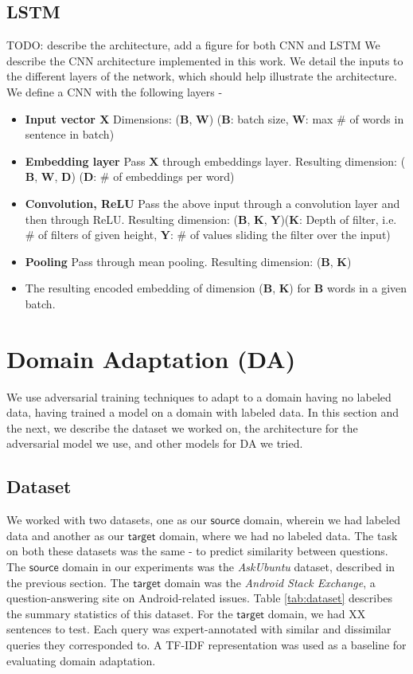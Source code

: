 \documentclass{sigkddExp}
\begin{document}
\subsection{LSTM}
{\color{red} TODO: describe the architecture, add a figure for both CNN and LSTM}
We describe the CNN architecture implemented in this work. We detail the inputs to the different layers of the network, which should help illustrate the architecture.
We define a CNN with the following layers -
\begin{itemize}[topsep=0pt,itemsep=-1ex,partopsep=1ex,parsep=1ex]
\item \textbf{Input vector $\mathbf{X}$} Dimensions: ($\mathbf{B}$, $\mathbf{W}$) ($\mathbf{B}$: batch size, $\mathbf{W}$: max \# of words in sentence in batch)
\item \textbf{Embedding layer} Pass $\mathbf{X}$ through embeddings layer. Resulting dimension: ($\mathbf{B}$, $\mathbf{W}$, $\mathbf{D}$) ($\mathbf{D}$: \# of embeddings per word)
\item \textbf{Convolution, ReLU} Pass the above input through a convolution layer and then through ReLU. Resulting dimension: ($\mathbf{B}$, $\mathbf{K}$, $\mathbf{Y}$)($\mathbf{K}$: Depth of filter, i.e. \# of filters of given height, $\mathbf{Y}$: \# of values sliding the filter over the input)
\item \textbf{Pooling} Pass through mean pooling. Resulting dimension: ($\mathbf{B}$, $\mathbf{K}$)
\item The resulting encoded embedding of dimension ($\mathbf{B}$, $\mathbf{K}$) for $\mathbf{B}$ words in a given batch.
\end{itemize}

\section{Domain Adaptation (DA)}
\label{domain_adapt}
 We use adversarial training techniques \cite{ganin2015unsupervised} to adapt to a domain having no labeled data, having trained a model on a domain with labeled data. In this section and the next, we describe the dataset we worked on, the architecture for the adversarial model we use, and other models for DA we tried.


\subsection{Dataset}
We worked with two datasets, one as our $\mathsf{source}$ domain, wherein we had labeled data and another as our $\mathsf{target}$ domain, where we had no labeled data. The task on both these datasets was the same - to predict similarity between questions. The $\mathsf{source}$ domain in our experiments was the \textit{AskUbuntu} dataset, described in the previous section. The $\mathsf{target}$ domain was the \textit{Android Stack Exchange}, a question-answering site on Android-related issues. Table \ref{tab:dataset} describes the summary statistics of this dataset. For the $\mathsf{target}$ domain, we had {\color{red} XX} sentences to test. Each query was expert-annotated with similar and dissimilar queries they corresponded to. A TF-IDF representation was used as a baseline for evaluating domain adaptation.
\end{document}
